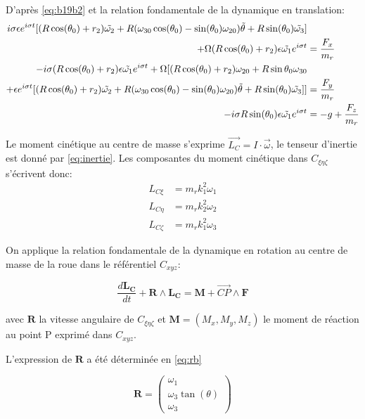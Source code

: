 D'après \ref{eq:b19b2} et la relation fondamentale de la dynamique en translation:
\begin{align}
  i \sigma \epsilon e^{i \sigma t}[(R\cos(\theta_0)+r_2) \Tilde{\omega_2} +R(\omega_{30}\cos(\theta_0)-\sin(\theta_0)\omega_{20}) \Tilde{\theta}+R\sin(\theta_0) \Tilde{\omega_3} ]& \nonumber \\
    +\Omega (R\cos(\theta_0)+r_2)\epsilon \Tilde{\omega_1} e^{i \sigma t}&=\frac{F_x}{m_r} \nonumber \\
    -i \sigma( R\cos(\theta_0)+r_2)\epsilon \Tilde{\omega_1} e^{i \sigma t}
    + \Omega [(R\cos(\theta_0)+r_2)\omega_{20}+R \sin{\theta_0}\omega_{30}& \nonumber\\ 
    + \epsilon e^{i \sigma t}[(R\cos(\theta_0)+r_2) \Tilde{\omega_2} +R(\omega_{30}\cos(\theta_0)-\sin(\theta_0)\omega_{20}) \Tilde{\theta}+R\sin(\theta_0) \Tilde{\omega_3} ] ]&=\frac{F_y}{m_r} \nonumber \\
    -i \sigma R \sin(\theta_0)\epsilon \Tilde{\omega_1} e^{i \sigma t}&=- g +\frac{F_z}{m_r}
  \label{eq:b20}
\end{align}

Le moment cinétique au centre de masse s'exprime $\vec{L_{C}}=I \cdot \vec{\omega}$, le tenseur d'inertie est donné par \ref{eq:inertie}.
Les composantes du moment cinétique dans $C_{\xi \eta \zeta}$ s'écrivent donc:
\begin{align}
    L_{C\xi }&=m_r k_1^2 \omega_{1} \nonumber\\
    L_{C\eta}&=m_r k_2^2 \omega_{2} \nonumber\\
    L_{C\zeta }&=m_r k_1^2 \omega_{3}
  \label{eq:b6b}
\end{align}

On applique la relation fondamentale de la dynamique en rotation au centre de masse de la roue dans le référentiel $C_{xyz}$:

\begin{equation}
    \frac{d \mathbf{L_{C}}}{dt} + \mathbf{R} \wedge \mathbf{L_{C}} = \mathbf{M}+ \overrightarrow{CP} \wedge \mathbf{F} 
\label{eq:rfdr2}
\end{equation}

avec $\mathbf{R}$ la vitesse angulaire de $C_{\xi \eta \zeta}$ et $\mathbf{M}=(M_x,M_y,M_z)$ le moment de réaction au point P exprimé dans $C_{xyz}$.

L'expression de $\mathbf{R}$ a été déterminée en \ref{eq:rb}

\begin{equation}
   \mathbf{R}= 
\begin{pmatrix}
    \omega_1  \\
    \omega_{3}\tan(\theta) \\
    \omega_3     
\end{pmatrix} 
\label{eq:rb3}
\end{equation}

